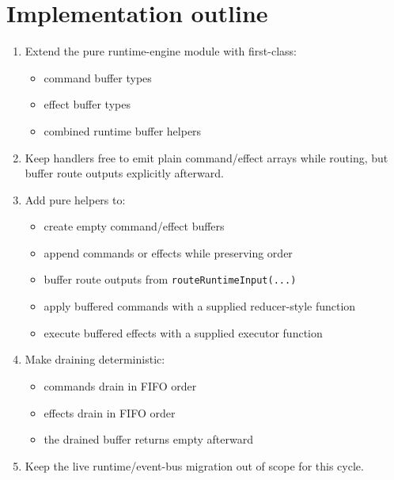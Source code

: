 \section{Implementation outline}\label{record-153-implementation-outline}

\begin{enumerate}
\def\labelenumi{\arabic{enumi}.}
\tightlist
\item
  Extend the pure runtime-engine module with first-class:

  \begin{itemize}
  \tightlist
  \item
    command buffer types
  \item
    effect buffer types
  \item
    combined runtime buffer helpers
  \end{itemize}
\item
  Keep handlers free to emit plain command/effect arrays while routing, but buffer route outputs explicitly afterward.
\item
  Add pure helpers to:

  \begin{itemize}
  \tightlist
  \item
    create empty command/effect buffers
  \item
    append commands or effects while preserving order
  \item
    buffer route outputs from \texttt{r\allowbreak{}o\allowbreak{}u\allowbreak{}t\allowbreak{}e\allowbreak{}R\allowbreak{}u\allowbreak{}n\allowbreak{}t\allowbreak{}i\allowbreak{}m\allowbreak{}e\allowbreak{}I\allowbreak{}n\allowbreak{}p\allowbreak{}u\allowbreak{}t\allowbreak{}(\allowbreak{}.\allowbreak{}.\allowbreak{}.\allowbreak{})}
  \item
    apply buffered commands with a supplied reducer-style function
  \item
    execute buffered effects with a supplied executor function
  \end{itemize}
\item
  Make draining deterministic:

  \begin{itemize}
  \tightlist
  \item
    commands drain in FIFO order
  \item
    effects drain in FIFO order
  \item
    the drained buffer returns empty afterward
  \end{itemize}
\item
  Keep the live runtime/event-bus migration out of scope for this cycle.
\end{enumerate}

